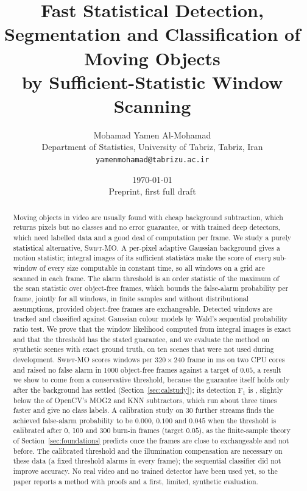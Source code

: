 \documentclass[11pt,a4paper]{article}
\title{Fast Statistical Detection, Segmentation and Classification of Moving Objects\\ by Sufficient-Statistic Window Scanning}
\author{Mohamad Yamen Al-Mohamad\\[2pt]
\small Department of Statistics, University of Tabriz, Tabriz, Iran\\
\small \texttt{yamenmohamad@tabrizu.ac.ir}}
\date{\today\\[2pt]\small Preprint, first full draft}
\theoremstyle{definition}
\newcommand{\swift}{\textsc{Swift-MO}}
\begin{document}
\maketitle

\begin{abstract}
Moving objects in video are usually found with cheap background subtraction, which returns pixels but no classes and no error guarantee, or with trained deep detectors, which need labelled data and a good deal of computation per frame.
We study a purely statistical alternative, \swift{}.
A per-pixel adaptive Gaussian background gives a motion statistic; integral images of its sufficient statistics make the score of \emph{every} sub-window of every size computable in constant time, so all windows on a grid are scanned in each frame.
The alarm threshold is an order statistic of the maximum of the scan statistic over object-free frames, which bounds the false-alarm probability per frame, jointly for all windows, in finite samples and without distributional assumptions, provided object-free frames are exchangeable.
Detected windows are tracked and classified against Gaussian colour models by Wald's sequential probability ratio test.
We prove that the window likelihood computed from integral images is exact and that the threshold has the stated guarantee, and we evaluate the method on synthetic scenes with exact ground truth, on ten scenes that were not used during development.
\swift{} scores \NwinPerFrame{} windows per $320\times240$ frame in \msSwift{} ms on two CPU cores and raised no false alarm in 1000 object-free frames against a target of $0.05$, a result we show to come from a conservative threshold, because the guarantee itself holds only after the background has settled (Section~\ref{sec:calstudy}); its detection F$_1$ is \fSwift{}, slightly below the \fMog{} of OpenCV's MOG2 and KNN subtractors, which run about three times faster and give no class labels.
A calibration study on 30 further streams finds the achieved false-alarm probability to be $0.000$, $0.100$ and $0.045$ when the threshold is calibrated after 0, 100 and 300 burn-in frames (target $0.05$), as the finite-sample theory of Section~\ref{sec:foundations} predicts once the frames are close to exchangeable and not before.
The calibrated threshold and the illumination compensation are necessary on these data (a fixed threshold alarms in every frame); the sequential classifier did not improve accuracy.
No real video and no trained detector have been used yet, so the paper reports a method with proofs and a first, limited, synthetic evaluation.
\end{abstract}
\end{document}
